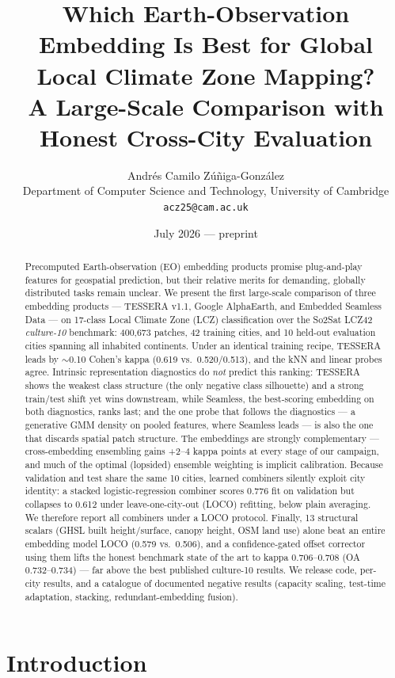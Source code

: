 \documentclass[11pt]{article}
\title{Which Earth-Observation Embedding Is Best for Global Local Climate
Zone Mapping?\\ A Large-Scale Comparison with Honest Cross-City Evaluation}
\author{Andr\'es Camilo Z\'u\~niga-Gonz\'alez\\
  Department of Computer Science and Technology, University of Cambridge\\
  \texttt{acz25@cam.ac.uk}
  \and
  \todo{co-authors / supervisors}
}
\date{July 2026 --- preprint}
\begin{document}
\maketitle

\begin{abstract}
Precomputed Earth-observation (EO) embedding products promise
plug-and-play features for geospatial prediction, but their relative
merits for demanding, globally distributed tasks remain unclear. We
present the first large-scale comparison of three embedding products
--- TESSERA v1.1, Google AlphaEarth, and Embedded Seamless Data ---
on 17-class Local Climate Zone (LCZ) classification over the So2Sat
LCZ42 \emph{culture-10} benchmark: 400{,}673 patches, 42 training
cities, and 10 held-out evaluation cities spanning all inhabited
continents. Under an identical training recipe, TESSERA leads by
$\sim$0.10 Cohen's kappa (0.619 vs.\ 0.520/0.513), and the kNN and
linear probes agree. Intrinsic representation diagnostics do \emph{not} predict
this ranking: TESSERA shows the weakest class structure (the only
negative class silhouette) and a strong train/test shift yet wins
downstream, while Seamless, the best-scoring embedding on both
diagnostics, ranks last; and
the one probe that follows the diagnostics --- a generative GMM
density on pooled features, where Seamless leads --- is also the one
that discards spatial patch structure. The
embeddings are strongly complementary --- cross-embedding ensembling
gains +2--4 kappa points at every stage of our campaign, and much of
the optimal (lopsided) ensemble weighting is implicit calibration.
Because validation and test share the same 10 cities, learned
combiners silently exploit city identity: a stacked
logistic-regression combiner scores 0.776 fit on validation but
collapses to 0.612 under leave-one-city-out (LOCO) refitting,
below plain averaging. We therefore report all combiners under a LOCO
protocol. Finally, 13 structural scalars (GHSL built height/surface,
canopy height, OSM land use) alone beat an entire embedding model
LOCO (0.579 vs.\ 0.506), and a confidence-gated offset
corrector using them lifts the honest benchmark state of the art to
kappa 0.706--0.708 (OA 0.732--0.734) --- far above the best
published culture-10 results. We release code, per-city results, and
a catalogue of documented negative results (capacity scaling,
test-time adaptation, stacking, redundant-embedding fusion).
\end{abstract}

\section{Introduction}\label{sec:intro}
\end{document}
